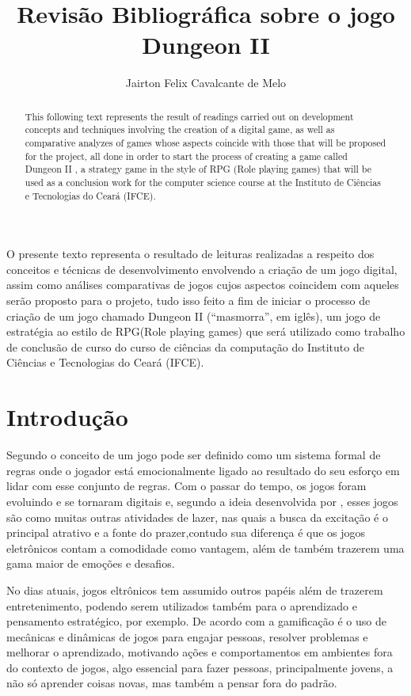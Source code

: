 \documentclass[12pt]{article}
\title{Revisão Bibliográfica sobre o jogo Dungeon II}
\author{Jairton Felix Cavalcante de Melo\inst{1} }
\begin{document}
 

\maketitle

\begin{abstract}
  This following text represents the result of readings carried out on development concepts and techniques involving the creation of a digital game, as well as comparative analyzes of games whose aspects coincide with those that will be proposed for the project, all done in order to start the process of creating a game called Dungeon II , a strategy game in the style of RPG (Role playing games) that will be used as a conclusion work for the computer science course at the Instituto de Ciências e Tecnologias do Ceará (IFCE).
\end{abstract}
     
\begin{resumo} 
  O presente texto representa o resultado de leituras realizadas a respeito dos conceitos e técnicas de desenvolvimento envolvendo a criação de um jogo digital, assim como análises comparativas de jogos cujos aspectos coincidem com aqueles serão proposto para o projeto, tudo isso feito a fim de iniciar o processo de criação de um jogo  chamado Dungeon II (“masmorra”, em iglês), um jogo de estratégia ao estilo de RPG(Role playing games) que será utilizado como trabalho de conclusão de curso do curso de ciências da computação do Instituto de Ciências e Tecnologias do Ceará (IFCE).
\end{resumo}


\section{Introdução}

Segundo o conceito de \cite{loureirodesign} um jogo pode ser definido como um sistema formal de regras onde o jogador está emocionalmente ligado ao resultado do seu esforço em lidar com esse conjunto de regras. Com o passar do tempo, os jogos foram evoluindo e se tornaram digitais e, segundo a ideia desenvolvida por \cite{de2008jogos}, esses jogos são como muitas outras atividades de lazer, nas quais a busca da excitação é o principal atrativo e a fonte do prazer,contudo sua diferença é que os jogos eletrônicos contam a comodidade como vantagem, além de também trazerem uma gama maior de emoções e desafios.

No dias atuais, jogos eltrônicos tem assumido outros papéis além de trazerem entretenimento, podendo serem utilizados também para o aprendizado e pensamento estratégico, por exemplo. De acordo com \cite{gamif} a gamificação é o uso de mecânicas e dinâmicas de jogos para engajar pessoas, resolver problemas e melhorar o aprendizado, motivando ações e comportamentos em ambientes fora do contexto de jogos, algo essencial para fazer pessoas, principalmente jovens, a não só aprender coisas novas, mas também a pensar fora do padrão.
\end{document}
